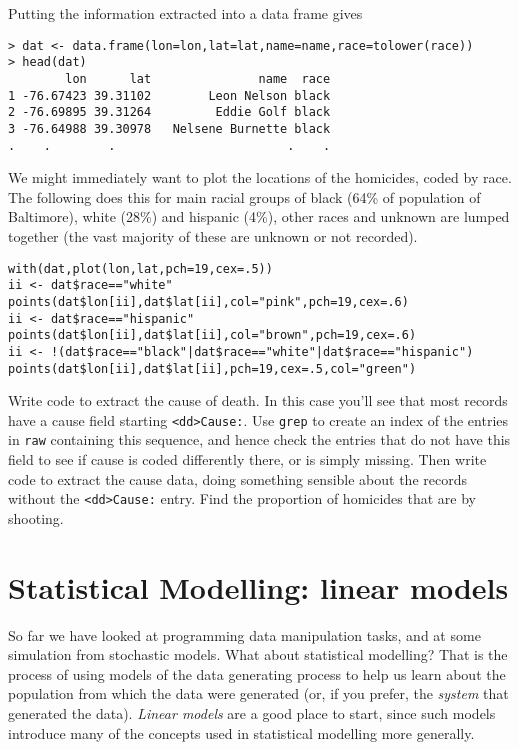 \documentclass[10pt] {article}
\newcommand{\eps}[3]
{{\begin{center}
 \rotatebox{#1}{\scalebox{#2}{\texttt{[image: \#3]}}}
 \end{center}}
}
\theoremstyle{definition}
\begin{document}
Putting the information extracted into a data frame gives
{\small \begin{verbatim}
> dat <- data.frame(lon=lon,lat=lat,name=name,race=tolower(race))
> head(dat)
        lon      lat               name  race
1 -76.67423 39.31102        Leon Nelson black
2 -76.69895 39.31264         Eddie Golf black
3 -76.64988 39.30978   Nelsene Burnette black
.    .        .                        .    .
\end{verbatim}}
We might immediately want to plot the locations of the homicides, coded by race. The following does this for main racial groups of black (64\% of population of Baltimore), white (28\%) and hispanic (4\%), other races and unknown are lumped together (the vast majority of these are unknown or not recorded). 
\begin{lstlisting}
with(dat,plot(lon,lat,pch=19,cex=.5))
ii <- dat$race=="white"
points(dat$lon[ii],dat$lat[ii],col="pink",pch=19,cex=.6)
ii <- dat$race=="hispanic"
points(dat$lon[ii],dat$lat[ii],col="brown",pch=19,cex=.6)
ii <- !(dat$race=="black"|dat$race=="white"|dat$race=="hispanic")
points(dat$lon[ii],dat$lat[ii],pch=19,cex=.5,col="green")
\end{lstlisting}

\eps{-90}{.5}{baltimore.eps}

 Write code to extract the cause of death. In this case you'll see that most records have a cause field starting \lstinline+<dd>Cause:+. Use {\tt grep} to create an index of the entries in {\tt raw} containing this sequence, and hence check the entries that do not have this field to see if cause is coded differently there, or is simply missing. Then write code to extract the cause data, doing something sensible about the records without the \lstinline+<dd>Cause:+ entry. Find the proportion of homicides that are by shooting.

\section{Statistical Modelling: linear models \label{sec:lm}}

So far we have looked at programming data manipulation tasks, and at some simulation from stochastic models. What about statistical modelling? That is the process of using models of the data generating process to help us learn about the population from which the data were generated (or, if you prefer, the {\em system} that generated the data). {\em Linear models} are a good place to start, since such models introduce many of the concepts used in statistical modelling more generally. 
\end{document}
